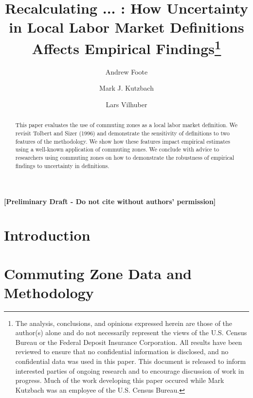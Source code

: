 \documentclass[12pt]{article}
\begin{document}
\title{Recalculating ... : How Uncertainty in Local Labor Market Definitions Affects Empirical Findings\thanks{The analysis, conclusions, and opinions expressed herein are those of the author(s) alone and do not necessarily represent the views of the U.S. Census Bureau or the Federal Deposit Insurance Corporation. All results have been reviewed to ensure that no confidential information is disclosed, and no confidential data was used in this paper. This document is released to inform interested parties of ongoing research and to encourage discussion of work in progress. Much of the work developing this paper occured while Mark Kutzbach was an employee of the U.S. Census Bureau.}}
\author[1]{Andrew Foote}
\author[2]{Mark J. Kutzbach}
\author[1,3]{Lars Vilhuber}
\maketitle

\begin{center}
\textbf{[Preliminary Draft - Do not cite without authors' permission]}
\end{center}

\begin{abstract}

This paper evaluates the use of commuting zones as a local labor market definition. We revisit Tolbert and Sizer (1996) and demonstrate the sensitivity of definitions to two features of the methodology. We show how these features impact empirical estimates using a well-known application of commuting zones. We conclude with advice to researchers using commuting zones on how to demonstrate the robustness of empirical findings to uncertainty in definitions.
\end{abstract}


\doublespacing

\section{Introduction \label{sec:intro}}


\section{Commuting Zone Data and Methodology \label{sec:method}}

\end{document}
